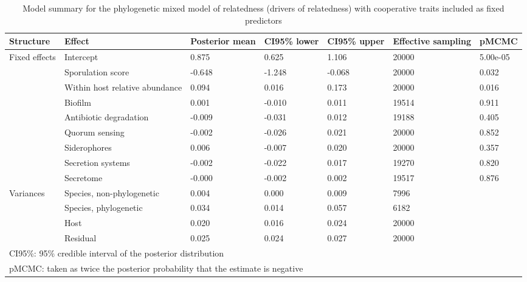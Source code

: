 \begin{table}

\caption{\label{tab:}Model summary for the phylogenetic mixed model of relatedness (drivers of relatedness) with cooperative traits included as fixed predictors}
\centering
\begin{tabular}[t]{lllllll}
\toprule
Structure & Effect & Posterior
 mean & CI95\% lower & CI95\% upper & Effective
 sampling & pMCMC\\
\midrule
Fixed effects & Intercept & 0.875 & 0.625 & 1.106 & 20000 & 5.00e-05\\
 & Sporulation score & -0.648 & -1.248 & -0.068 & 20000 & 0.032\\
 & Within host relative abundance & 0.094 & 0.016 & 0.173 & 20000 & 0.016\\
 & Biofilm & 0.001 & -0.010 & 0.011 & 19514 & 0.911\\
 & Antibiotic degradation & -0.009 & -0.031 & 0.012 & 19188 & 0.405\\
 & Quorum sensing & -0.002 & -0.026 & 0.021 & 20000 & 0.852\\
 & Siderophores & 0.006 & -0.007 & 0.020 & 20000 & 0.357\\
 & Secretion systems & -0.002 & -0.022 & 0.017 & 19270 & 0.820\\
 & Secretome & -0.000 & -0.002 & 0.002 & 19517 & 0.876\\
Variances & Species, non-phylogenetic & 0.004 & 0.000 & 0.009 & 7996 & \\
 & Species, phylogenetic & 0.034 & 0.014 & 0.057 & 6182 & \\
 & Host & 0.020 & 0.016 & 0.024 & 20000 & \\
 & Residual & 0.025 & 0.024 & 0.027 & 20000 & \\
\bottomrule
\multicolumn{7}{l}{\rule{0pt}{1em}CI95\%: 95\% credible interval of the posterior distribution}\\
\multicolumn{7}{l}{\rule{0pt}{1em}pMCMC: taken as twice the posterior probability that the estimate is negative}\\
\end{tabular}
\end{table}
